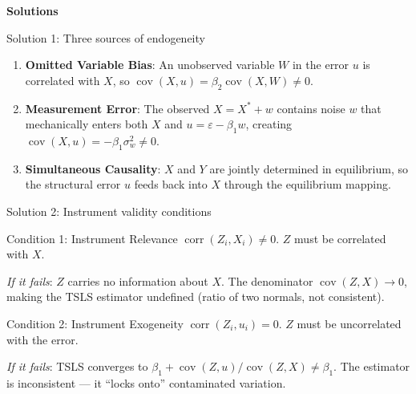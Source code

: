 \documentclass[10pt]{beamer}
\begin{document}
\appendix

\begin{frame}[plain]
  \centering
  \vfill
  {\Huge\bfseries Solutions}
  \vfill
\end{frame}

\begin{frame}{Solution 1: Three sources of endogeneity}
\label{s1}
\begin{enumerate}
  \item \textbf{Omitted Variable Bias}: An unobserved variable $W$ in the error $u$ is correlated with $X$, so $\operatorname{cov}(X, u) = \beta_2\operatorname{cov}(X, W) \neq 0$.

  \item \textbf{Measurement Error}: The observed $X = X^* + w$ contains noise $w$ that mechanically enters both $X$ and $u = \varepsilon - \beta_1 w$, creating $\operatorname{cov}(X, u) = -\beta_1\sigma_w^2 \neq 0$.

  \item \textbf{Simultaneous Causality}: $X$ and $Y$ are jointly determined in equilibrium, so the structural error $u$ feeds back into $X$ through the equilibrium mapping.
\end{enumerate}

\vfill
\hfill\hyperlink{q1}{}
\end{frame}

\begin{frame}{Solution 2: Instrument validity conditions}
\label{s2}
\begin{block}{Condition 1: Instrument Relevance}
$\operatorname{corr}(Z_i, X_i) \neq 0$. \quad $Z$ must be correlated with $X$.

\emph{If it fails}: $Z$ carries no information about $X$. The denominator $\operatorname{cov}(Z,X) \to 0$, making the TSLS estimator undefined (ratio of two normals, not consistent).
\end{block}

\begin{block}{Condition 2: Instrument Exogeneity}
$\operatorname{corr}(Z_i, u_i) = 0$. \quad $Z$ must be uncorrelated with the error.

\emph{If it fails}: TSLS converges to $\beta_1 + \operatorname{cov}(Z,u)/\operatorname{cov}(Z,X) \neq \beta_1$. The estimator is inconsistent --- it ``locks onto'' contaminated variation.
\end{block}

\vfill
\hfill\hyperlink{q2}{}
\end{frame}
\end{document}

